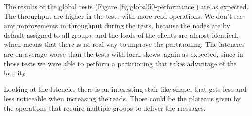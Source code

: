 

\newpage
The results of the global tests (Figure \ref{fig:global50-performance}) are as expected. The throughput are higher in the tests with more read operations. We don't see any improvements in throughput during the tests, because the nodes are by default assigned to all groups, and the loads of the clients are almost identical, which means that there is no real way to improve the partitioning. The latencies are on average worse than the tests with local skews, again as expected, since in those tests we were able to perform a partitioning that takes advantage of the locality.

Looking at the latencies there is an interesting stair-like shape, that gets less and less noticeable when increasing the reads. Those could be the plateaus given by the operations that require multiple groups to deliver the messages.


